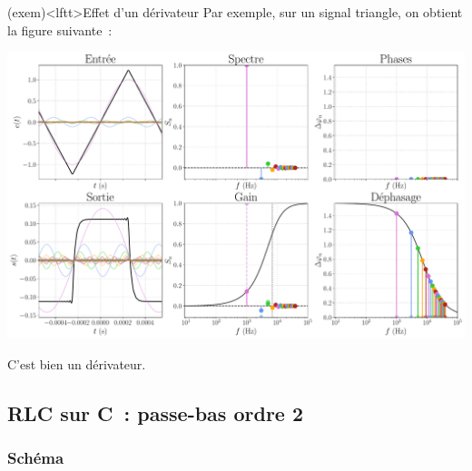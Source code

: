 \documentclass[../../main/main.tex]{subfiles}
\begin{document}
\begin{tcb*}[breakable](exem)<lftt>{Effet d'un dérivateur}
	Par exemple, sur un signal triangle, on obtient la figure suivante~:
	\begin{center}
		\includegraphics[width=.95\linewidth]{fft_trgl_bth_PH-fe=1000-fc=7000}
		\label{fig:trglPH}
	\end{center}
	C'est bien un dérivateur.
\end{tcb*}

\subsection{RLC sur C~: passe-bas ordre 2}
\subsubsection{Schéma}
\vspace{-15pt}
\begin{center}
	\vspace{-15pt}
\end{center}
\end{document}
